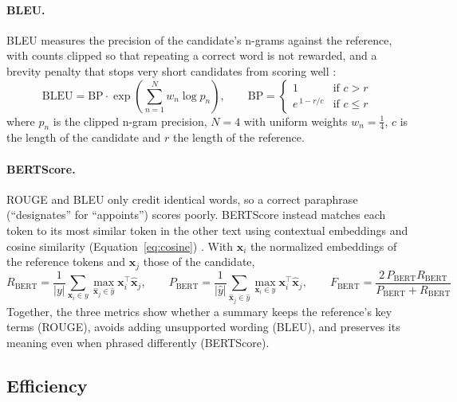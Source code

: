 \paragraph{BLEU.} BLEU measures the precision of the candidate's n-grams against the reference, with counts clipped so that repeating a correct word is not rewarded, and a brevity penalty that stops very short candidates from scoring well \citep{papineni2002bleu}:
\begin{equation}
  \text{BLEU} = \text{BP} \cdot \exp\!\left(\sum_{n=1}^{N} w_n \log p_n\right), \qquad
  \text{BP} = \begin{cases} 1 & \text{if } c > r \\ e^{\,1 - r/c} & \text{if } c \le r \end{cases} \label{eq:bleu}
\end{equation}
where $p_n$ is the clipped n-gram precision, $N = 4$ with uniform weights $w_n = \tfrac{1}{4}$, $c$ is the length of the candidate and $r$ the length of the reference.

\paragraph{BERTScore.} ROUGE and BLEU only credit identical words, so a correct paraphrase (``designates'' for ``appoints'') scores poorly. BERTScore instead matches each token to its most similar token in the other text using contextual embeddings and cosine similarity (Equation~\ref{eq:cosine}) \citep{zhang2020bertscore}. With $\mathbf{x}_i$ the normalized embeddings of the reference tokens and $\hat{\mathbf{x}}_j$ those of the candidate,
\begin{equation}
  R_{\text{BERT}} = \frac{1}{\lvert y \rvert} \sum_{\mathbf{x}_i \in y} \max_{\hat{\mathbf{x}}_j \in \hat{y}} \mathbf{x}_i^{\top} \hat{\mathbf{x}}_j, \qquad
  P_{\text{BERT}} = \frac{1}{\lvert \hat{y} \rvert} \sum_{\hat{\mathbf{x}}_j \in \hat{y}} \max_{\mathbf{x}_i \in y} \mathbf{x}_i^{\top} \hat{\mathbf{x}}_j, \qquad
  F_{\text{BERT}} = \frac{2\, P_{\text{BERT}} R_{\text{BERT}}}{P_{\text{BERT}} + R_{\text{BERT}}} \label{eq:bertscore}
\end{equation}
Together, the three metrics show whether a summary keeps the reference's key terms (ROUGE), avoids adding unsupported wording (BLEU), and preserves its meaning even when phrased differently (BERTScore).

\subsection{Efficiency}\label{sec:efficiency-metrics}

